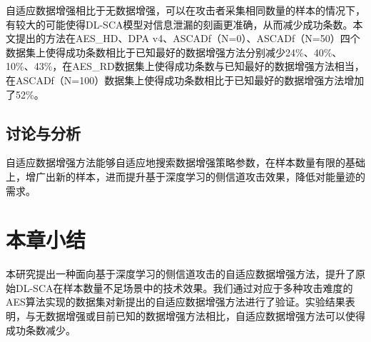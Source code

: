 {	自适应数据增强相比于无数据增强，可以在攻击者采集相同数量的样本的情况下，有较大的可能使得DL-SCA模型对信息泄漏的刻画更准确，从而减少成功条数。本文提出的方法在AES\_HD、DPA v4、ASCADf（N=0）、ASCADf（N=50）四个数据集上使得成功条数相比于已知最好的数据增强方法分别减少24\%、40\%、10\%、43\%，在AES\_RD数据集上使得成功条数与已知最好的数据增强方法相当，在ASCADf（N=100）数据集上使得成功条数相比于已知最好的数据增强方法增加了52\%。
	\subsection{讨论与分析}
	自适应数据增强方法能够自适应地搜索数据增强策略参数，在样本数量有限的基础上，增广出新的样本，进而提升基于深度学习的侧信道攻击效果，降低对能量迹的需求。
	\section{本章小结}
	本研究提出一种面向基于深度学习的侧信道攻击的自适应数据增强方法，提升了原始DL-SCA在样本数量不足场景中的技术效果。我们通过对应于多种攻击难度的AES算法实现的数据集对新提出的自适应数据增强方法进行了验证。实验结果表明，与无数据增强或目前已知的数据增强方法相比，自适应数据增强方法可以使得成功条数减少。
}